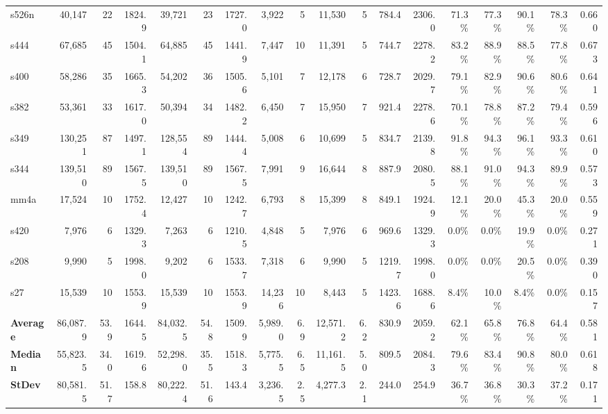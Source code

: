 \documentclass{article}
\theoremstyle{definition}
\begin{document}
\begin{table}[ht]
{\begin{tabular}{lrrrrrrrrrrrrrrrrr}
s526n & 40,147 & 22 & 1824.9 & 39,721 & 23 & 1727.0 & 3,922 & 5 & 11,530 & 5 & 784.4 & 2306.0 & 71.3\% & 77.3\% & 90.1\% & 78.3\% & 0.660 \\
s444 & 67,685 & 45 & 1504.1 & 64,885 & 45 & 1441.9 & 7,447 & 10 & 11,391 & 5 & 744.7 & 2278.2 & 83.2\% & 88.9\% & 88.5\% & 77.8\% & 0.673 \\
s400 & 58,286 & 35 & 1665.3 & 54,202 & 36 & 1505.6 & 5,101 & 7 & 12,178 & 6 & 728.7 & 2029.7 & 79.1\% & 82.9\% & 90.6\% & 80.6\% & 0.641 \\
s382 & 53,361 & 33 & 1617.0 & 50,394 & 34 & 1482.2 & 6,450 & 7 & 15,950 & 7 & 921.4 & 2278.6 & 70.1\% & 78.8\% & 87.2\% & 79.4\% & 0.596 \\
s349 & 130,251 & 87 & 1497.1 & 128,554 & 89 & 1444.4 & 5,008 & 6 & 10,699 & 5 & 834.7 & 2139.8 & 91.8\% & 94.3\% & 96.1\% & 93.3\% & 0.610 \\
s344 & 139,510 & 89 & 1567.5 & 139,510 & 89 & 1567.5 & 7,991 & 9 & 16,644 & 8 & 887.9 & 2080.5 & 88.1\% & 91.0\% & 94.3\% & 89.9\% & 0.573 \\
mm4a & 17,524 & 10 & 1752.4 & 12,427 & 10 & 1242.7 & 6,793 & 8 & 15,399 & 8 & 849.1 & 1924.9 & 12.1\% & 20.0\% & 45.3\% & 20.0\% & 0.559 \\
s420 & 7,976 & 6 & 1329.3 & 7,263 & 6 & 1210.5 & 4,848 & 5 & 7,976 & 6 & 969.6 & 1329.3 & 0.0\% & 0.0\% & 19.9\% & 0.0\% & 0.271 \\
s208 & 9,990 & 5 & 1998.0 & 9,202 & 6 & 1533.7 & 7,318 & 6 & 9,990 & 5 & 1219.7 & 1998.0 & 0.0\% & 0.0\% & 20.5\% & 0.0\% & 0.390 \\
s27 & 15,539 & 10 & 1553.9 & 15,539 & 10 & 1553.9 & 14,236 & 10 & 8,443 & 5 & 1423.6 & 1688.6 & 8.4\% & 10.0\% & 8.4\% & 0.0\% & 0.157 \\
\midrule
\textbf{Average} & 86,087.9 & 53.9 & 1644.5 & 84,032.5 & 54.8 & 1509.9 & 5,989.0 & 6.9 & 12,571.2 & 6.2 & 830.9 & 2059.2 & 62.1\% & 65.8\% & 76.8\% & 64.4\% & 0.581 \\
\textbf{Median} & 55,823.5 & 34.0 & 1619.6 & 52,298.0 & 35.5 & 1518.3 & 5,775.5 & 6.5 & 11,161.5 & 5.0 & 809.5 & 2084.3 & 79.6\% & 83.4\% & 90.8\% & 80.0\% & 0.618 \\
\textbf{StDev} & 80,581.5 & 51.7 & 158.8 & 80,222.4 & 51.6 & 143.4 & 3,236.5 & 2.5 & 4,277.3 & 2.1 & 244.0 & 254.9 & 36.7\% & 36.8\% & 30.3\% & 37.2\% & 0.171 \\
\bottomrule
\end{tabular}%
}
\end{table}
\end{document}
